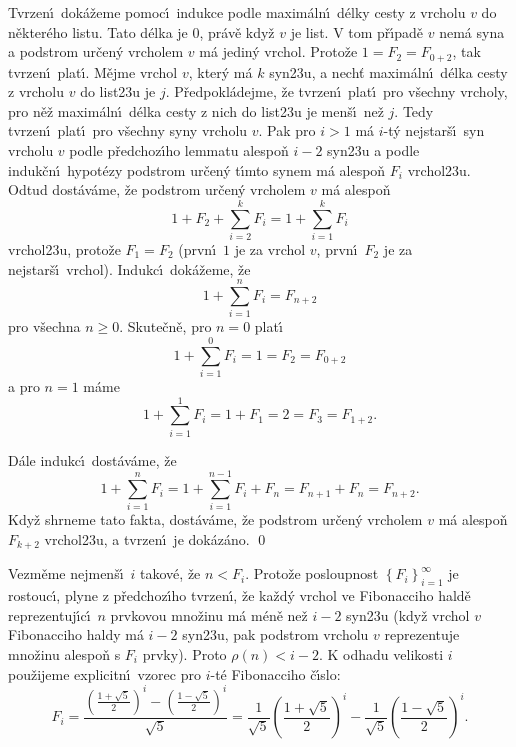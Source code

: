 Tvrzen\'\i\ dok\'a\v zeme pomoc\'\i\ indukce 
podle maxim\'aln\'\i\ d\'elky cesty z vrcholu $v$ do n\v ekter\'eho 
listu.  Tato d\'elka je $0$, pr\'av\v e kdy\v z $v$ je list.  V tom 
p\v r\'\i pad\v e $v$ nem\'a syna a podstrom ur\v cen\'y vrcholem $
v$ m\'a 
jedin\'y vrchol.  Proto\v ze $1=F_2=F_{0+2}$, tak tvrzen\'\i\ plat\'\i .  
M\v ejme vrchol $v$, kter\'y m\'a $k$ 
syn\accent23u, a nech\v t maxim\'aln\'\i\ d\'elka cesty z vrcholu $
v$ do 
list\accent23u je $j$. P\v redpokl\'adej\-me, \v ze tvrzen\'\i\ plat\'\i\ pro 
v\v sechny vrcholy, pro n\v e\v z maxim\'aln\'\i\ d\'elka cesty z nich 
do list\accent23u je men\v s\'\i\ ne\v z $j$.  Tedy tvrzen\'\i\ plat\'\i\ pro 
v\v sechny syny vrcholu $v$.  Pak pro $i>1$ m\'a $i$-t\'y nejstar\v s\'\i\ 
syn vrcholu $v$ podle p\v redchoz\'\i ho lemmatu alespo\v n $i-2$ 
syn\accent23u a podle induk\v cn\'\i\ hypot\'ezy podstrom ur\v cen\'y 
t\'\i mto synem m\'a alespo\v n $F_i$ vrchol\accent23u.  Odtud 
dost\'av\'ame, \v ze podstrom ur\v cen\'y vrcholem $v$ m\'a alespo\v n 
$$1+F_2+\sum_{i=2}^kF_i=1+\sum_{i=1}^kF_i$$
vrchol\accent23u, proto\v ze $F_1=F_2$ (prvn\'\i\ $1$ je za vrchol $
v$, 
prvn\'\i\ $F_2$ je za nejstar\v s\'\i\ vrchol). Indukc\'\i\ dok\'a\v zeme, \v ze 
$$1+\sum_{i=1}^nF_i=F_{n+2}$$
pro v\v sechna $n\ge 0$. Skute\v cn\v e, pro $n=0$ plat\'\i\ 
$$1+\sum_{i=1}^0F_i=1=F_2=F_{0+2}$$
a pro $n=1$ m\'ame 
$$1+\sum_{i=1}^1F_i=1+F_1=2=F_3=F_{1+2}.$$
\medskip

\flushpar D\'ale indukc\'\i\ dost\'av\'ame, \v ze 
$$1+\sum_{i=1}^nF_i=1+\sum_{i=1}^{n-1}F_i+F_n=F_{n+1}+F_n=F_{n+2}
.$$
Kdy\v z shrneme tato fakta, dost\'av\'ame, \v ze podstrom 
ur\v cen\'y vrcholem $v$ m\'a alespo\v n $F_{k+2}$ vrchol\accent23u, a 
tvrzen\'\i\ je dok\'az\'ano. \qed
\enddemo

\flushpar Vezm\v eme nejmen\v s\'\i\ $i$ takov\'e, \v ze $n<F_i$. Proto\v ze 
posloupnost $\left\{F_i\right\}_{i=1}^{\infty}$ je rostouc\'\i , plyne z p\v redchoz\'\i ho 
tvrzen\'\i , \v ze ka\v zd\'y vrchol ve Fibonacciho hald\v e 
reprezentuj\'\i c\'\i\ $n$ prvkovou mno\v zinu m\'a m\'en\v e ne\v z $
i-2$ 
syn\accent23u (kdy\v z vrchol $v$ Fibonacciho haldy m\'a $i-2$ 
syn\accent23u, pak podstrom vrcholu $v$ reprezentuje 
mno\v zinu ales\-po\v n s $F_i$ prvky). Proto $\rho \left(n\right)<i-2$. K odhadu 
velikosti $i$ pou\v zijeme explicitn\'\i\ vzorec 
pro $i$-t\'e Fibonacciho \v c\'\i slo: 
$$F_i=\frac {\left(\frac {1+\sqrt 5}2\right)^i-\left(\frac {1-\sqrt 5}
2\right)^i}{\sqrt 5}=\frac 1{\sqrt 5}\left(\frac {1+\sqrt 5}2\right)^i
-\frac 1{\sqrt 5}\left(\frac {1-\sqrt 5}2\right)^i.$$
\medskip

